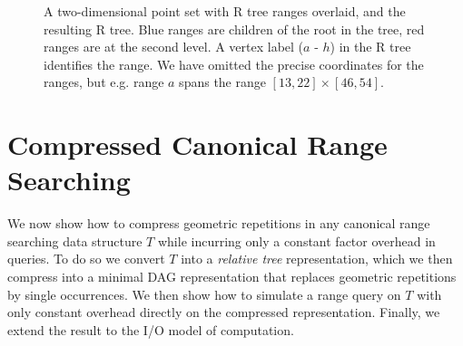 \begin{figure}[tb]
	\begin{center}
	\quad\quad\quad\quad{}
	\caption{A two-dimensional point set with R tree ranges overlaid, and the resulting R tree. Blue ranges are children of the root in the tree, red ranges are at the second level. A vertex label ($a$ - $h$) in the R tree identifies the range. We have omitted the precise coordinates for the ranges, but e.g. range $a$ spans the range $[13, 22] \times [46, 54]$. \label{fig:r-rep}}
	\end{center}
\end{figure} 

\section{Compressed Canonical Range Searching}\label{sec:compcrs}
We now show how to compress geometric repetitions in any canonical range searching data structure $T$ while incurring only a constant factor overhead in queries. To do so we convert $T$ into a \emph{relative tree} representation, which we then compress into a minimal DAG representation that replaces geometric repetitions by single occurrences. We then show how to simulate a range query on $T$ with only constant overhead directly on the compressed representation. Finally, we extend the result to the I/O model of computation.

